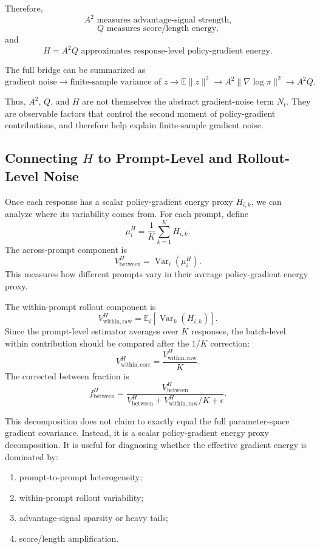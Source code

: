 \documentclass[11pt,a4paper]{article}
\begin{document}
Therefore,
\[
\boxed{
A^2 \text{ measures advantage-signal strength,}
}
\]
\[
\boxed{
Q \text{ measures score/length energy,}
}
\]
and
\[
\boxed{
H=A^2Q \text{ approximates response-level policy-gradient energy.}
}
\]

The full bridge can be summarized as
\[
\text{gradient noise}
\rightarrow
\text{finite-sample variance of } z
\rightarrow
\mathbb{E}\|z\|^2
\rightarrow
A^2\|\nabla\log\pi\|^2
\rightarrow
A^2Q.
\]

Thus, \(A^2\), \(Q\), and \(H\) are not themselves the abstract gradient-noise term \(N_t\). They are observable factors that control the second moment of policy-gradient contributions, and therefore help explain finite-sample gradient noise.

\subsection{Connecting \(H\) to Prompt-Level and Rollout-Level Noise}

Once each response has a scalar policy-gradient energy proxy \(H_{i,k}\), we can analyze where its variability comes from. For each prompt, define
\[
\mu_i^H
=
\frac{1}{K}
\sum_{k=1}^{K}
H_{i,k}.
\]
The across-prompt component is
\[
V_{\mathrm{between}}^H
=
\operatorname{Var}_i(\mu_i^H).
\]
This measures how different prompts vary in their average policy-gradient energy proxy.

The within-prompt rollout component is
\[
V_{\mathrm{within,raw}}^H
=
\mathbb{E}_i
\left[
\operatorname{Var}_k(H_{i,k})
\right].
\]
Since the prompt-level estimator averages over \(K\) responses, the batch-level within contribution should be compared after the \(1/K\) correction:
\[
V_{\mathrm{within,corr}}^H
=
\frac{V_{\mathrm{within,raw}}^H}{K}.
\]
The corrected between fraction is
\[
f_{\mathrm{between}}^H
=
\frac{
V_{\mathrm{between}}^H
}{
V_{\mathrm{between}}^H+V_{\mathrm{within,raw}}^H/K+\epsilon
}.
\]

This decomposition does not claim to exactly equal the full parameter-space gradient covariance. Instead, it is a scalar policy-gradient energy proxy decomposition. It is useful for diagnosing whether the effective gradient energy is dominated by:
\begin{enumerate}[leftmargin=2em]
    \item prompt-to-prompt heterogeneity;
    \item within-prompt rollout variability;
    \item advantage-signal sparsity or heavy tails;
    \item score/length amplification.
\end{enumerate}
\end{document}
